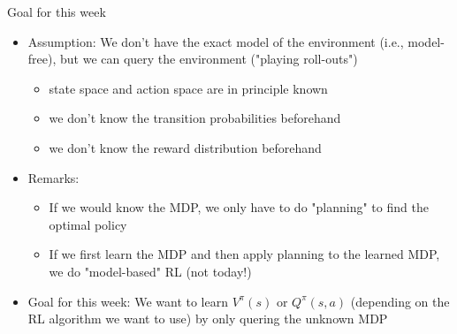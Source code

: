 \begin{frame}[c]{Goal for this week}

\begin{itemize}
	\item Assumption: We don't have the exact model of the environment (i.e., model-free), but we can query the environment ("playing roll-outs")
	\begin{itemize}
		\item state space and action space are in principle known
		\item we don't know the transition probabilities beforehand
		\item we don't know the reward distribution beforehand
	\end{itemize}
	\medskip
	\item Remarks:
	\begin{itemize}
		\item If we would know the MDP, we only have to do "planning" to find the optimal policy
		\item If we first learn the MDP and then apply planning to the learned MDP, we do "model-based" RL (not today!)
	\end{itemize}
	\medskip\pause
	\item Goal for this week: We want to learn $V^\pi(s)$ or $Q^\pi(s,a)$ (depending on the RL algorithm we want to use) by only quering the unknown MDP
\end{itemize}


\end{frame}


